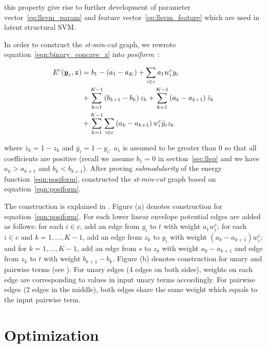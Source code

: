 \documentclass[sigconf, anonymous, review]{acmart}
\renewcommand{\citename}{\citet}
\renewcommand{\cite}{\citep}
\begin{document}
\noindent this property give rise to further development of
parameter vector~\eqref{eq:llsvm_param} and feature
vector~\eqref{eq:llsvm_feature} which are used in latent
structural SVM.

In order to construct the \emph{st-min-cut} graph, we rewrote
equation~\eqref{eqn:binary_concave_z} into
\emph{posiform}~\cite{Boros:MATH02}:

\begin{align}
  \label{eqn:posiform}  
  E^c({\boldsymbol{y}}_c, {\boldsymbol{z}})
  &= b_1 - (a_1 - a_K) + \sum_{i \in c} a_1 w^c_i y_i \notag\\
  & + \sum_{k = 1}^{K - 1} \left( b_{k+1} - b_k \right) z_k
    + \sum_{k = 1}^{K - 1} \left( a_k - a_{k+1} \right)
    \bar{z}_k\notag\\
  & + \sum_{k = 1}^{K - 1} \sum_{i \in c} \left( a_k - a_{k+1}
    \right) w^c_i \bar{y}_i z_k
\end{align}

\noindent where $\bar{z}_k = 1 - z_k$ and $\bar{y}_i = 1 - y_i$.
$a_1$ is assumed to be greater than $0$ so that all coefficients
are positive (recall we assume $b_1=0$ in section~\ref{sec:llep}
and we have $a_k > a_{k+1}$ and $b_k < b_{k+1}$). After proving
\emph{submodularity} of the energy function~\eqref{eqn:posiform},
\citename{gouldlearning} constructed the \emph{st-min-cut} graph
based on equation~\eqref{eqn:posiform}.

The construction is explained in . Figure
(a) denotes construction for equation~\eqref{eqn:posiform}. For
each lower linear envelope potential edges are added as follows:
for each $i \in c$, add an edge from $y_i$ to $t$ with weight
$a_1 w^c_i$; for each $i \in c$ and $k = 1, \ldots, K-1$, add an
edge from $z_k$ to $y_i$ with weight $(a_{k} - a_{k+1}) w^c_i$;
and for $k = 1, \ldots, K-1$, add an edge from $s$ to $z_k$ with
weight $a_k - a_{k+1}$ and edge from $z_k$ to $t$ with weight
$b_{k+1} - b_k$. Figure (b) denotes construction for unary and
pairwise terms (see \cite{Kolmogorov:PAMI04}). For unary edges (4
edges on both sides), weights on each edge are corresponding to
values in input unary terms accordingly. For pairwise edges (2
edges in the middle), both edges share the same weight which
equals to the input pairwise term.

\section{Optimization}
\label{sec:opt}
\end{document}
